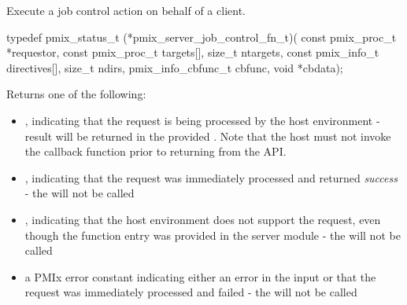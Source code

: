 Execute a job control action on behalf of a client.

\format

\cspecificstart
\begin{codepar}
typedef pmix_status_t (*pmix_server_job_control_fn_t)(
                             const pmix_proc_t *requestor,
                             const pmix_proc_t targets[],
                             size_t ntargets,
                             const pmix_info_t directives[],
                             size_t ndirs,
                             pmix_info_cbfunc_t cbfunc,
                             void *cbdata);
\end{codepar}
\cspecificend

\begin{arglist}
\end{arglist}

Returns one of the following:

\begin{itemize}
    \item {}, indicating that the request is being processed by the host environment - result will be returned in the provided . Note that the host must not invoke the callback function prior to returning from the \ac{API}.
    \item {}, indicating that the request was immediately processed and returned \textit{success} - the  will not be called
    \item {}, indicating that the host environment does not support the request, even though the function entry was provided in the server module - the  will not be called
    \item a PMIx error constant indicating either an error in the input or that the request was immediately processed and failed - the  will not be called
\end{itemize}

